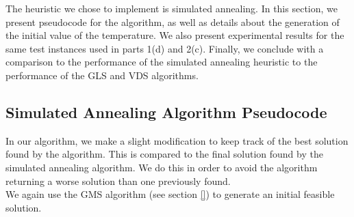\documentclass[12pt,a4paper,reqno]{article}
\begin{document}
The heuristic we chose to implement is simulated annealing. In this section, we present pseudocode for the algorithm, as well as details about the generation of the initial value of the temperature. We also present experimental results for the same test instances used in parts 1(d) and 2(c). Finally, we conclude with a comparison to the performance of the simulated annealing heuristic to the performance of the GLS and VDS algorithms.

\subsection*{Simulated Annealing Algorithm Pseudocode}
In our algorithm, we make a slight modification to keep track of the best solution found by the algorithm. This is compared to the final solution found by the simulated annealing algorithm. We do this in order to avoid the algorithm returning a worse solution than one previously found. \\

We again use the GMS algorithm (see section \ref{}) to generate an initial feasible solution. \\
\end{document}
